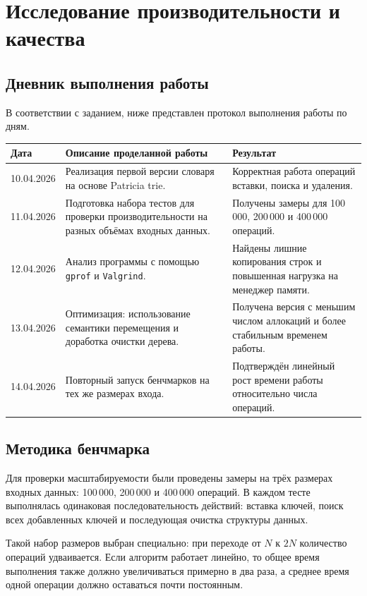 \section{Исследование производительности и качества}

\subsection{Дневник выполнения работы}

В соответствии с заданием, ниже представлен протокол выполнения работы по дням.

\begin{center}
\begin{tabular}{|p{3cm}|p{7cm}|p{4cm}|}
\hline
\textbf{Дата} & \textbf{Описание проделанной работы} & \textbf{Результат} \\ \hline
10.04.2026 & Реализация первой версии словаря на основе Patricia trie. & Корректная работа операций вставки, поиска и удаления. \\ \hline
11.04.2026 & Подготовка набора тестов для проверки производительности на разных объёмах входных данных. & Получены замеры для 100\,000, 200\,000 и 400\,000 операций. \\ \hline
12.04.2026 & Анализ программы с помощью \texttt{gprof} и \texttt{Valgrind}. & Найдены лишние копирования строк и повышенная нагрузка на менеджер памяти. \\ \hline
13.04.2026 & Оптимизация: использование семантики перемещения и доработка очистки дерева. & Получена версия с меньшим числом аллокаций и более стабильным временем работы. \\ \hline
14.04.2026 & Повторный запуск бенчмарков на тех же размерах входа. & Подтверждён линейный рост времени работы относительно числа операций. \\ \hline
\end{tabular}
\end{center}

\subsection{Методика бенчмарка}

Для проверки масштабируемости были проведены замеры на трёх размерах входных данных:
100\,000, 200\,000 и 400\,000 операций. В каждом тесте выполнялась одинаковая последовательность действий:
вставка ключей, поиск всех добавленных ключей и последующая очистка структуры данных.

Такой набор размеров выбран специально: при переходе от $N$ к $2N$ количество операций удваивается.
Если алгоритм работает линейно, то общее время выполнения также должно увеличиваться примерно в два раза,
а среднее время одной операции должно оставаться почти постоянным.

